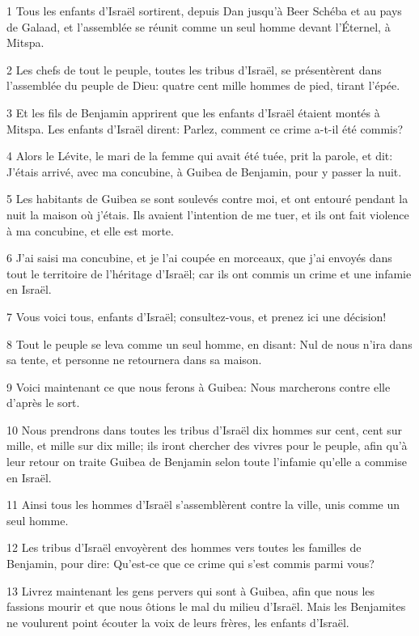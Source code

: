 \par 1 Tous les enfants d'Israël sortirent, depuis Dan jusqu'à Beer Schéba et au pays de Galaad, et l'assemblée se réunit comme un seul homme devant l'Éternel, à Mitspa.
\par 2 Les chefs de tout le peuple, toutes les tribus d'Israël, se présentèrent dans l'assemblée du peuple de Dieu: quatre cent mille hommes de pied, tirant l'épée.
\par 3 Et les fils de Benjamin apprirent que les enfants d'Israël étaient montés à Mitspa. Les enfants d'Israël dirent: Parlez, comment ce crime a-t-il été commis?
\par 4 Alors le Lévite, le mari de la femme qui avait été tuée, prit la parole, et dit: J'étais arrivé, avec ma concubine, à Guibea de Benjamin, pour y passer la nuit.
\par 5 Les habitants de Guibea se sont soulevés contre moi, et ont entouré pendant la nuit la maison où j'étais. Ils avaient l'intention de me tuer, et ils ont fait violence à ma concubine, et elle est morte.
\par 6 J'ai saisi ma concubine, et je l'ai coupée en morceaux, que j'ai envoyés dans tout le territoire de l'héritage d'Israël; car ils ont commis un crime et une infamie en Israël.
\par 7 Vous voici tous, enfants d'Israël; consultez-vous, et prenez ici une décision!
\par 8 Tout le peuple se leva comme un seul homme, en disant: Nul de nous n'ira dans sa tente, et personne ne retournera dans sa maison.
\par 9 Voici maintenant ce que nous ferons à Guibea: Nous marcherons contre elle d'après le sort.
\par 10 Nous prendrons dans toutes les tribus d'Israël dix hommes sur cent, cent sur mille, et mille sur dix mille; ils iront chercher des vivres pour le peuple, afin qu'à leur retour on traite Guibea de Benjamin selon toute l'infamie qu'elle a commise en Israël.
\par 11 Ainsi tous les hommes d'Israël s'assemblèrent contre la ville, unis comme un seul homme.
\par 12 Les tribus d'Israël envoyèrent des hommes vers toutes les familles de Benjamin, pour dire: Qu'est-ce que ce crime qui s'est commis parmi vous?
\par 13 Livrez maintenant les gens pervers qui sont à Guibea, afin que nous les fassions mourir et que nous ôtions le mal du milieu d'Israël. Mais les Benjamites ne voulurent point écouter la voix de leurs frères, les enfants d'Israël.
